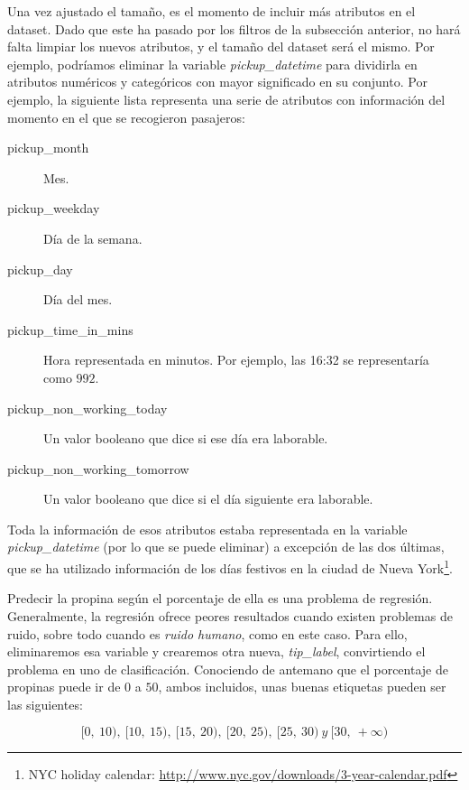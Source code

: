 Una vez ajustado el tamaño, es el momento de incluir más atributos en el dataset. Dado que este ha pasado por los filtros de la subsección anterior, no hará falta limpiar los nuevos atributos, y el tamaño del dataset será el mismo. Por ejemplo, podríamos eliminar la variable \emph{pickup\_datetime} para dividirla en atributos numéricos y categóricos con mayor significado en su conjunto. Por ejemplo, la siguiente lista representa una serie de atributos con información del momento en el que se recogieron pasajeros:

\begin{description}
\item[pickup\_month] Mes.

\item[pickup\_weekday] Día de la semana.

\item[pickup\_day] Día del mes.

\item[pickup\_time\_in\_mins] Hora representada en minutos. Por ejemplo, las 16:32 se representaría como $992$.

\item[pickup\_non\_working\_today] Un valor booleano que dice si ese día era laborable.

\item[pickup\_non\_working\_tomorrow] Un valor booleano que dice si el día siguiente era laborable.
\end{description}

Toda la información de esos atributos estaba representada en la variable \emph{pickup\_datetime} (por lo que se puede eliminar) a excepción de las dos últimas, que se ha utilizado información de los días festivos en la ciudad de Nueva York\footnote{NYC holiday calendar: \href{http://www.nyc.gov/html/opa/downloads/pdf/3-year\%20Calendar\%202013-2014-2015.pdf}{http://www.nyc.gov/downloads/3-year-calendar.pdf}}.

Predecir la propina según el porcentaje de ella es una problema de regresión. Generalmente, la regresión ofrece peores resultados cuando existen problemas de ruido, sobre todo cuando es \emph{ruido humano}, como en este caso. Para ello, eliminaremos esa variable y crearemos otra nueva, \emph{tip\_label}, convirtiendo el problema en uno de clasificación. Conociendo de antemano que el porcentaje de propinas puede ir de $0$ a $50$, ambos incluidos, unas buenas etiquetas pueden ser las siguientes:

$$
[0,\:10),\:[10,\:15),\:[15,\:20),\:[20,\:25),\:[25,\:30)\:y\:[30,\:+\infty)
$$

